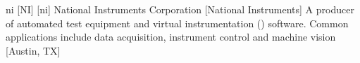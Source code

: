 \newglsXcompany%
{ni}%
[NI]%
[ni]%
{National Instruments\textsuperscript{\texttrademark} Corporation}%
[National Instruments]%
{A producer of automated test equipment and virtual instrumentation () software. Common applications include data acquisition, instrument control and machine vision \cite{website:National_Instruments}}%
[Austin, TX]%